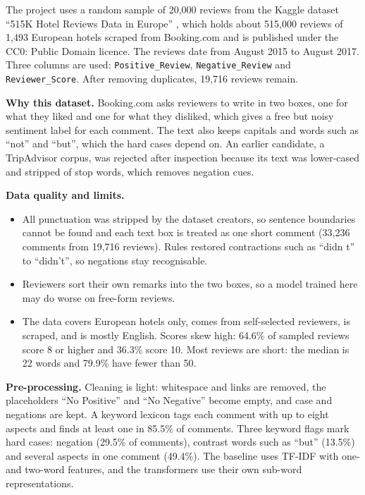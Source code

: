 \documentclass[11pt,a4paper]{article}
\begin{document}
The project uses a random sample of 20,000 reviews from the Kaggle dataset ``515K Hotel Reviews Data in Europe'' \cite{liu515k}, which holds about 515,000 reviews of 1,493 European hotels scraped from Booking.com and is published under the CC0: Public Domain licence. The reviews date from August 2015 to August 2017. Three columns are used: \texttt{Positive\_Review}, \texttt{Negative\_Review} and \texttt{Reviewer\_Score}. After removing duplicates, 19,716 reviews remain.

\textbf{Why this dataset.} Booking.com asks reviewers to write in two boxes, one for what they liked and one for what they disliked, which gives a free but noisy sentiment label for each comment. The text also keeps capitals and words such as ``not'' and ``but'', which the hard cases depend on. An earlier candidate, a TripAdvisor corpus, was rejected after inspection because its text was lower-cased and stripped of stop words, which removes negation cues.

\textbf{Data quality and limits.}
\begin{itemize}[nosep]
  \item All punctuation was stripped by the dataset creators, so sentence boundaries cannot be found and each text box is treated as one short comment (33,236 comments from 19,716 reviews). Rules restored contractions such as ``didn t'' to ``didn't'', so negations stay recognisable.
  \item Reviewers sort their own remarks into the two boxes, so a model trained here may do worse on free-form reviews.
  \item The data covers European hotels only, comes from self-selected reviewers, is scraped, and is mostly English. Scores skew high: 64.6\% of sampled reviews score 8 or higher and 36.3\% score 10. Most reviews are short: the median is 22 words and 79.9\% have fewer than 50.
\end{itemize}

\textbf{Pre-processing.} Cleaning is light: whitespace and links are removed, the placeholders ``No Positive'' and ``No Negative'' become empty, and case and negations are kept. A keyword lexicon tags each comment with up to eight aspects and finds at least one in 85.5\% of comments. Three keyword flags mark hard cases: negation (29.5\% of comments), contrast words such as ``but'' (13.5\%) and several aspects in one comment (49.4\%). The baseline uses TF-IDF with one- and two-word features, and the transformers use their own sub-word representations.
\end{document}
